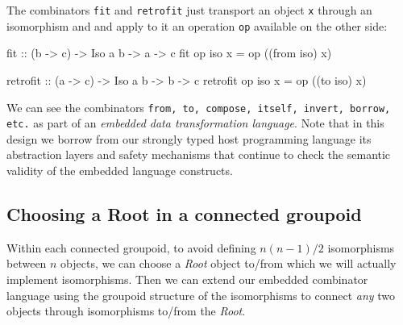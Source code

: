 \documentclass[]{INCLUDES/llncs}
\begin{document}
The combinators {\tt fit} and {\tt retrofit} 
just transport an object {\tt x}
through an isomorphism and and apply 
to it an operation {\tt op} available on
the other side:
\begin{code}
fit :: (b -> c) -> Iso a b -> a -> c
fit op iso x = op ((from iso) x)

retrofit :: (a -> c) -> Iso a b -> b -> c
retrofit op iso x = op ((to iso) x)
\end{code}

We can see the combinators {\tt from, to, compose, itself, invert, borrow,
etc.} as part of an {\em embedded data transformation language}.
Note that in this design we borrow from our
strongly typed host programming language
its abstraction layers and safety mechanisms
that continue to check the semantic validity of
the embedded language constructs.

\subsection{Choosing a Root in a connected groupoid}
Within each connected groupoid,
to avoid defining $n(n-1)/2$ isomorphisms between $n$ objects,
we can choose a {\em Root} object to/from which we will actually
implement isomorphisms. Then we can extend our embedded
combinator language using the groupoid structure of the isomorphisms
to connect {\em any} two objects through isomorphisms to/from
the {\em Root}.
\begin{comment}
\begindc{\commdiag}[20]
\obj(10,10)[X]{$Root$}
\obj(14,10)[Aa]{$A$}

\obj(13,12)[Ac]{$B$}
\obj(12,13)[Ad]{$C$}

\obj(10,14)[Af]{$D$}

\obj(8,13)[Ah]{$E$}
\obj(7,12)[Ai]{$F$}

\obj(6,10)[Ak]{$G$}

\obj(7,8)[Am]{$H$}
\obj(8,7)[An]{$I$}

\obj(10,6)[Ap]{$J$}

\obj(12,7)[Ar]{$K$}
\obj(13,8)[As]{$L$}

\mor{X}{Aa}{$a$}

\mor{X}{Ac}{$b$}
\mor{X}{Ad}{$c$}

\mor{X}{Af}{$d$}

\mor{X}{Ah}{$e$}
\mor{X}{Ai}{$f$}

\mor{X}{Ak}{$g$}

\mor{X}{Am}{$h$}
\mor{X}{An}{$i$}

\mor{X}{Ap}{$j$}

\mor{X}{Ar}{$k$}
\mor{X}{As}{$l$}
\enddc
\end{comment}
\end{document}
